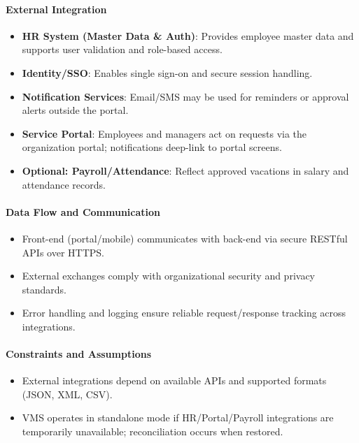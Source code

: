 \documentclass[12pt,a4paper]{article}
\begin{document}
\paragraph{External Integration}
\begin{itemize}
    \item \textbf{HR System (Master Data \& Auth)}: Provides employee master data and supports user validation and role-based access.
    \item \textbf{Identity/SSO}: Enables single sign-on and secure session handling.
    \item \textbf{Notification Services}: Email/SMS may be used for reminders or approval alerts outside the portal.
    \item \textbf{Service Portal}: Employees and managers act on requests via the organization portal; notifications deep-link to portal screens.
    \item \textbf{Optional: Payroll/Attendance}: Reflect approved vacations in salary and attendance records.
\end{itemize}

\paragraph{Data Flow and Communication}
\begin{itemize}
    \item Front-end (portal/mobile) communicates with back-end via secure RESTful APIs over HTTPS.
    \item External exchanges comply with organizational security and privacy standards.
    \item Error handling and logging ensure reliable request/response tracking across integrations.
\end{itemize}

\paragraph{Constraints and Assumptions}
\begin{itemize}
    \item External integrations depend on available APIs and supported formats (JSON, XML, CSV).
    \item VMS operates in standalone mode if HR/Portal/Payroll integrations are temporarily unavailable; reconciliation occurs when restored.
\end{itemize}
\end{document}
